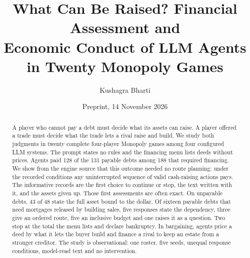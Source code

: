 \documentclass[10pt,twocolumn,letterpaper]{article}
\title{\textbf{What Can Be Raised? Financial Assessment and\\Economic Conduct of LLM Agents in Twenty Monopoly Games}}
\author{Kushagra Bharti}
\date{Preprint, 14 November 2026}
\begin{document}

\maketitle
\begin{abstract}
\noindent A player who cannot pay a debt must decide what its assets can raise. A player offered a trade must decide what the trade lets a rival raise and build. We study both judgments in twenty complete four-player Monopoly games among four configured LLM systems. The prompt states no rules and the financing menu lists deeds without prices. Agents paid 128 of the 131 payable debts among 188 that required financing. We show from the engine source that this outcome needed no route planning: under the recorded conditions any uninterrupted sequence of valid cash-raising actions pays. The informative records are the first choice to continue or stop, the text written with it, and the assets given up. Those first assessments are often exact. On unpayable debts, 43 of 48 state the full asset bound to the dollar. Of sixteen payable debts that need mortgages released by building sales, five responses state the dependency, three give an ordered route, five an inclusive budget and one raises it as a question. Two stop at the total the menu lists and declare bankruptcy. In bargaining, agents price a deed by what it lets the buyer build and finance a rival to keep an estate from a stronger creditor. The study is observational: one roster, five seeds, unequal response conditions, model-read text and no intervention.
\end{abstract}








\label{mainend}
\begingroup\small\setlength{\bibsep}{2pt}

\endgroup
\clearpage\onecolumn\appendix

\end{document}
